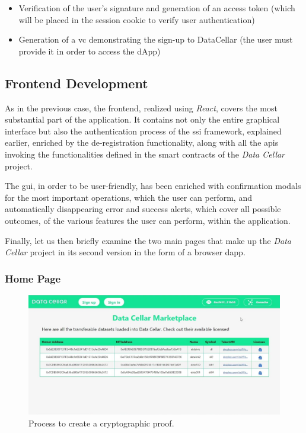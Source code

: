 \begin{itemize}
  \item Verification of the user's signature and generation of an access token (which will be placed in the session cookie to verify user authentication)
  \item Generation of a \gls{vc} demonstrating the sign-up to DataCellar (the user must provide it in order to access the dApp)
\end{itemize}

\subsection{Frontend Development}

As in the previous case, the frontend, realized using \textit{React}, covers the most substantial part of the application. It contains not only the entire graphical interface but 
also the authentication process of the \gls{ssi} framework, explained earlier, enriched by the de-registration functionality, along with all the \gls{api}s invoking the functionalities 
defined in the smart contracts of the \textit{Data Cellar} project.

The \gls{gui}, in order to be user-friendly, has been enriched with confirmation modals for the most important operations, which the user can perform, and automatically 
disappearing error and success alerts, which cover all possible outcomes, of the various features the user can perform, within the application.

Finally, let us then briefly examine the two main pages that make up the \textit{Data Cellar} project in its second version in the form of a browser \gls{dapp}. 

\subsubsection{Home Page}

\begin{figure}[h]  
  \centering
  \includegraphics[width=1\textwidth]{Images/c6_4.jpg} 
  \caption{Process to create a cryptographic proof.}
\end{figure}

